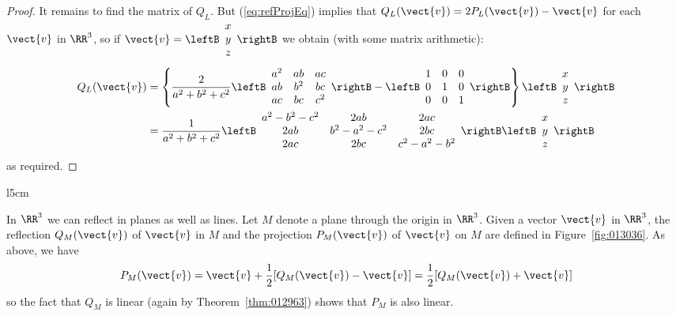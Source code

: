 \begin{proof}
It remains to find the matrix of $Q_{L}$. But (\ref{eq:refProjEq}) implies that $Q_{L}(\vect{v}) = 2P_{L}(\vect{v}) - \vect{v}$ for each $\vect{v}$ in $\RR^3$, so if $\vect{v} = \leftB
\begin{array}{c}
x \\
y \\
z
\end{array}
\rightB$ we obtain (with some matrix arithmetic):
\begin{align*}
Q_{L}(\vect{v}) &= \left\lbrace \frac{2}{a^2 + b^2 + c^2} \leftB
\begin{array}{ccc}
a^2 & ab & ac \\
ab & b^2 & bc \\
ac & bc & c^2
\end{array}
\rightB
- 
\leftB
\begin{array}{ccc}
1 & 0 & 0 \\
0 & 1 & 0 \\
0 & 0 & 1
\end{array}
\rightB
\right\rbrace \leftB
\begin{array}{c}
x \\
y \\
z
\end{array}
\rightB \\ 
& = 
\frac{1}{a^2 + b^2 + c^2} \leftB
\begin{array}{ccc}
a^2 - b^2 - c^2 & 2ab & 2ac \\
2ab & b^2 - a^2 - c^2 & 2bc \\
2ac & 2bc & c^2 - a^2 - b^2
\end{array}
\rightB  \leftB
\begin{array}{c}
x \\
y \\
z
\end{array}
\rightB
\end{align*}
as required.
\end{proof}

\begin{wrapfigure}[9]{l}{5cm} 
\vspace{-2em}
\centering

\caption{\label{fig:013036}}
\end{wrapfigure}

In $\RR^3$ we can reflect in planes as well as lines. Let $M$ denote a plane through the origin in $\RR^3$. Given a vector $\vect{v}$ in $\RR^3$, the reflection $Q_{M}(\vect{v})$ of $\vect{v}$ in $M$ and the projection $P_{M}(\vect{v})$ of $\vect{v}$ on $M$ are defined in Figure~\ref{fig:013036}. As above, we have
\begin{equation*}
P_{M}(\vect{v}) = \vect{v} + \frac{1}{2}[Q_{M}(\vect{v}) - \vect{v}] = \frac{1}{2}[Q_{M}(\vect{v}) + \vect{v}]
\end{equation*}
so the fact that $Q_{M}$ is linear (again by Theorem~\ref{thm:012963}) shows that $P_{M}$ is also linear. 


